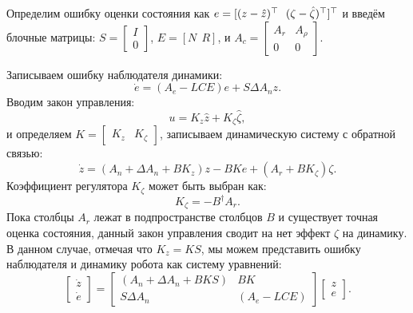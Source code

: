 Определим ошибку оценки состояния как $e = [ (z-\hat{z})^\top \ \ (\zeta-\hat{\zeta})^\top ]^\top$ и введём блочные матрицы:
${S} = \begin{bmatrix}
	{I} \\ 0
\end{bmatrix}$, 
${E}=[ {N} \ \ {R}]$, и 
$
{A}_c=    \begin{bmatrix}
	{A}_r  & {A}_{\rho} \\
	0  & 0
\end{bmatrix}.
$

Записываем ошибку наблюдателя динамики:
%
\begin{equation}
	\label{eq:part1_error_dynamics}
	\dot e= ({A}_e-{L}{C}{E})e +{S}\Delta {A}_n z.
\end{equation}
%
Вводим закон управления:
%
\begin{equation}
	u={K}_z \hat{z}+{K}_{\zeta} \hat{\zeta},
\end{equation}
%
и определяем ${K}=\begin{bmatrix}
	{K}_z & {K}_{\zeta}
\end{bmatrix}$, записываем динамическую систему с обратной связью:
%
\begin{equation}
	\label{eq:part1_active_dynamics}
	\dot{z}=({A}_n+\Delta {A}_n +{B}{K}_z)z-{B}{K}e+({A}_r+{B}{K}_{\zeta})\zeta.
\end{equation}
%
Коэффициент регулятора ${K}_{\zeta}$ может быть выбран как:
%
\begin{equation}
	\label{eq:part1_static_control}
	{K}_{\zeta}=-{B}^{\dagger}{A}_r.
\end{equation}
%
Пока столбцы ${A}_r$ лежат в подпространстве столбцов ${B}$ и существует точная оценка состояния, данный закон управления сводит на нет эффект $\zeta$ на динамику. В данном случае, отмечая что ${K}_z={K}{S}$,  мы можем представить ошибку наблюдателя и динамику робота как систему уравнений:
%
\begin{equation}
	\label{eq:part1_system}
	\begin{bmatrix}
		\dot{z} \\ \dot{e}
	\end{bmatrix}=\begin{bmatrix}
		({A}_n+\Delta {A}_n +{B}{K}{S}) & {B}{K} \\
		{S} \Delta {A}_n & ({A}_e-{L}{C}{E})        \end{bmatrix}\begin{bmatrix}
		z \\ e
	\end{bmatrix}.
\end{equation}

